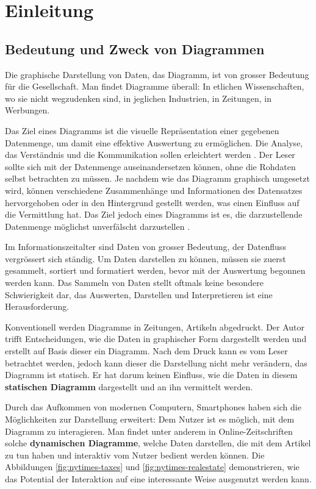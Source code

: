 \chapter{Einleitung}
\section{Bedeutung  und Zweck von Diagrammen}

Die graphische Darstellung von Daten, das Diagramm, ist von grosser Bedeutung für die Gesellschaft. Man findet Diagramme überall: In etlichen Wissenschaften, wo sie nicht wegzudenken sind, in jeglichen Industrien, in Zeitungen, in Werbungen.


Das Ziel eines Diagramms ist die visuelle Repräsentation einer gegebenen Datenmenge, um damit eine effektive Auswertung zu ermöglichen. Die Analyse, das Verständnis und die Kommunikation sollen erleichtert werden \cite{viz}. Der Leser sollte sich mit der Datenmenge auseinandersetzen können, ohne die Rohdaten selbst betrachten zu müssen. Je nachdem wie das Diagramm graphisch umgesetzt wird, können verschiedene Zusammenhänge und Informationen des Datensatzes hervorgehoben oder in den Hintergrund gestellt werden, was einen Einfluss auf die Vermittlung hat. 
Das Ziel jedoch eines Diagramms ist es, die darzustellende Datenmenge möglichst unverfälscht darzustellen \cite{viz}. %

Im Informationszeitalter sind Daten von grosser Bedeutung, der Datenfluss vergrössert sich ständig. Um Daten darstellen zu können, müssen sie zuerst gesammelt, sortiert und formatiert werden, bevor mit der Auswertung begonnen werden kann. Das Sammeln von Daten stellt oftmals keine besondere Schwierigkeit dar, das Auswerten, Darstellen und Interpretieren ist eine Herausforderung.

Konventionell werden Diagramme in Zeitungen, Artikeln abgedruckt. Der Autor trifft Entscheidungen, wie die Daten in graphischer Form dargestellt werden und erstellt auf Basis dieser ein Diagramm. Nach dem Druck kann es vom Leser betrachtet werden, jedoch kann dieser die Darstellung nicht mehr verändern, das Diagramm ist statisch. Er hat darum keinen Einfluss, wie die Daten in diesem \textbf{statischen Diagramm} dargestellt und an ihn vermittelt werden.

Durch das Aufkommen von modernen Computern, Smartphones haben sich die Möglichkeiten zur Darstellung erweitert: Dem Nutzer ist es möglich, mit dem Diagramm zu interagieren. Man findet unter anderem in Online-Zeitschriften solche \textbf{dynamischen Diagramme}, welche Daten darstellen, die mit dem Artikel zu tun haben und interaktiv vom Nutzer bedient werden können. Die Abbildungen \ref{fig:nytimes-taxes} und \ref{fig:nytimes-realestate} demonstrieren, wie das Potential der Interaktion auf eine interessante Weise ausgenutzt werden kann.

